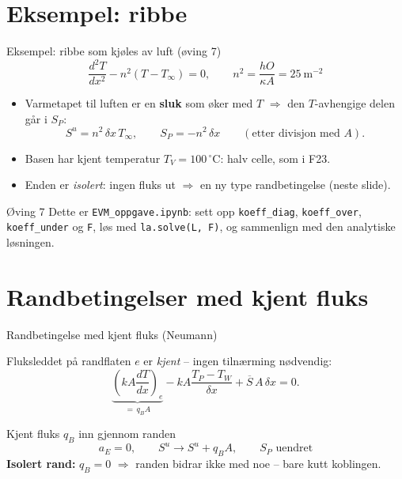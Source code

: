 \documentclass[11pt,aspectratio=169]{beamer}
\begin{document}
\section{Eksempel: ribbe}

\begin{frame}{Eksempel: ribbe som kjøles av luft (øving 7)}
\[
\frac{d^2T}{dx^2} - n^2(T - T_\infty) = 0, \qquad n^2 = \frac{hO}{\kappa A} = 25~\text{m}^{-2}
\]
\begin{itemize}
\item Varmetapet til luften er en \textbf{sluk} som øker med $T$ $\Rightarrow$ den $T$-avhengige delen går i $S_P$:
\[
S^u = n^2\,\delta x\,T_\infty, \qquad S_P = -n^2\,\delta x \qquad (\text{etter divisjon med } A).
\]
\item Basen har kjent temperatur $T_V = 100\,^\circ$C: halv celle, som i F23.
\item Enden er \emph{isolert}: ingen fluks ut $\Rightarrow$ en ny type randbetingelse (neste slide).
\end{itemize}
\begin{remb}{Øving 7}
Dette er \texttt{EVM\_oppgave.ipynb}: sett opp \texttt{koeff\_diag}, \texttt{koeff\_over}, \texttt{koeff\_under} og \texttt{F}, løs med \texttt{la.solve(L, F)}, og sammenlign med den analytiske løsningen.
\end{remb}
\end{frame}

\section{Randbetingelser med kjent fluks}

\begin{frame}{Randbetingelse med kjent fluks (Neumann)}
\begin{center}
\end{center}
Fluksleddet på randflaten $e$ er \emph{kjent} -- ingen tilnærming nødvendig:
\[
\underbrace{\left(kA\frac{dT}{dx}\right)_e}_{=\,q_B A} - kA\frac{T_P-T_W}{\delta x} + \overline S\,A\,\delta x = 0 .
\]
\begin{oppsumb}{Kjent fluks $q_B$ inn gjennom randen}
\[
a_E = 0, \qquad S^u \to S^u + q_B A, \qquad S_P \text{ uendret}
\]
\textbf{Isolert rand:} $q_B = 0$ $\Rightarrow$ randen bidrar ikke med noe -- bare kutt koblingen.
\end{oppsumb}
\end{frame}
\end{document}
